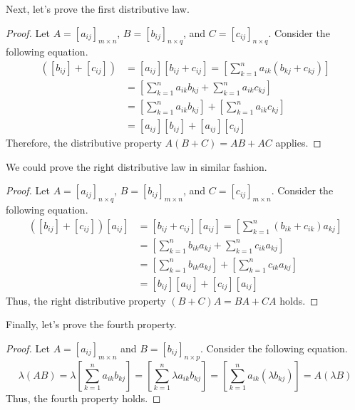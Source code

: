 \documentclass[../main.tex]{subfiles}
\begin{document}
Next, let's prove the first distributive law.

\begin{proof}
Let $A = [a_{ij}]_{m \times n}$, $B = [b_{ij}]_{n \times q}$,
and $C = [c_{ij}]_{n \times q}$. Consider the following equation.
\begin{align*}
    [a_{ij}] \left( [b_{ij}] + [c_{ij}] \right)
    &= [a_{ij}] [b_{ij} + c_{ij}]
    = \left[ \sum_{k=1}^{n} a_{ik} (b_{kj} + c_{kj}) \right] \\
    &= \left[
        \sum_{k=1}^{n} a_{ik} b_{kj} + \sum_{k=1}^{n} a_{ik} c_{kj}
    \right] \\
    &= \left[ \sum_{k=1}^{n} a_{ik} b_{kj} \right]
        + \left[ \sum_{k=1}^{n} a_{ik} c_{kj} \right] \\
    &= [a_{ij}] [b_{ij}] + [a_{ij}] [c_{ij}]
\end{align*}
Therefore, the distributive property $A(B + C) = AB + AC$ applies.
\end{proof}

We could prove the right distributive law in similar fashion.

\begin{proof}
Let $A = [a_{ij}]_{n \times q}$, $B = [b_{ij}]_{m \times n}$,
and $C = [c_{ij}]_{m \times n}$. Consider the following equation.
\begin{align*}
    \left( [b_{ij}] + [c_{ij}] \right) [a_{ij}]
    &= [b_{ij} + c_{ij}] [a_{ij}]
    = \left[ \sum_{k=1}^{n} (b_{ik} + c_{ik}) a_{kj} \right] \\
    &= \left[
        \sum_{k=1}^{n} b_{ik} a_{kj} + \sum_{k=1}^{n} c_{ik} a_{kj}
    \right] \\
    &= \left[ \sum_{k=1}^{n} b_{ik} a_{kj} \right]
        + \left[ \sum_{k=1}^{n} c_{ik} a_{kj} \right] \\
    &= [b_{ij}] [a_{ij}] + [c_{ij}] [a_{ij}]
\end{align*}
Thus, the right distributive property $(B + C)A = BA + CA$ holds.
\end{proof}

Finally, let's prove the fourth property.

\begin{proof}
Let $A = [a_{ij}]_{m \times n}$ and $B = [b_{ij}]_{n \times p}$.
Consider the following equation.
\[
\lambda (AB)
= \lambda \left[ \sum_{k = 1}^{n} a_{ik} b_{kj} \right]
= \left[ \sum_{k = 1}^{n} \lambda a_{ik} b_{kj} \right]
= \left[ \sum_{k = 1}^{n} a_{ik} (\lambda b_{kj}) \right]
= A(\lambda B)
\]
Thus, the fourth property holds.
\end{proof}
\end{document}
